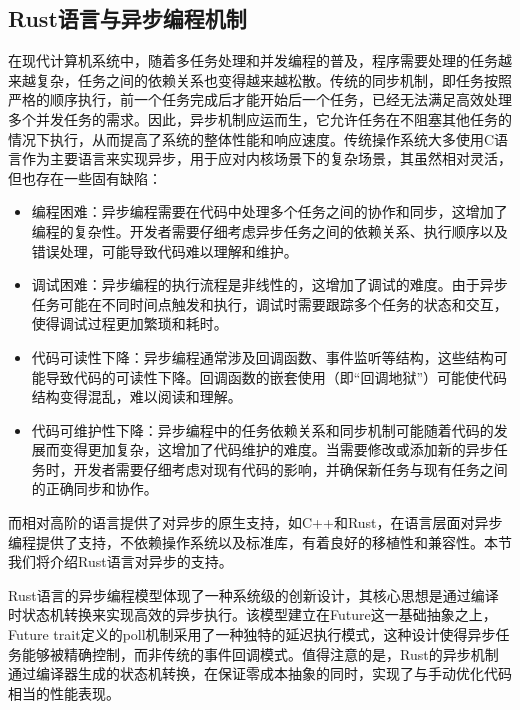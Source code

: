\subsection{Rust语言与异步编程机制}
在现代计算机系统中，随着多任务处理和并发编程的普及\cite{rights2005software}，程序需要处理的任务越来越复杂，任务之间的依赖关系也变得越来越松散。传统的同步机制，即任务按照严格的顺序执行，前一个任务完成后才能开始后一个任务，已经无法满足高效处理多个并发任务的需求\cite{adya2002cooperative}。因此，异步机制应运而生\cite{deligiannis2015asynchronous}，它允许任务在不阻塞其他任务的情况下执行，从而提高了系统的整体性能和响应速度。传统操作系统大多使用C语言作为主要语言来实现异步\cite{bovet2005understanding}，用于应对内核场景下的复杂场景，其虽然相对灵活，但也存在一些固有缺陷：
\begin{itemize}
    \item 编程困难：异步编程需要在代码中处理多个任务之间的协作和同步，这增加了编程的复杂性。开发者需要仔细考虑异步任务之间的依赖关系、执行顺序以及错误处理，可能导致代码难以理解和维护。
    \item 调试困难：异步编程的执行流程是非线性的，这增加了调试的难度。由于异步任务可能在不同时间点触发和执行，调试时需要跟踪多个任务的状态和交互，使得调试过程更加繁琐和耗时。
    \item 代码可读性下降：异步编程通常涉及回调函数、事件监听等结构，这些结构可能导致代码的可读性下降。回调函数的嵌套使用（即“回调地狱”）可能使代码结构变得混乱，难以阅读和理解。
    \item 代码可维护性下降：异步编程中的任务依赖关系和同步机制可能随着代码的发展而变得更加复杂，这增加了代码维护的难度。当需要修改或添加新的异步任务时，开发者需要仔细考虑对现有代码的影响，并确保新任务与现有任务之间的正确同步和协作。
  \end{itemize}

而相对高阶的语言提供了对异步的原生支持，如C++\cite{belson2020c}和Rust\cite{kroning2023concurrency}，在语言层面对异步编程提供了支持，不依赖操作系统以及标准库，有着良好的移植性和兼容性。本节我们将介绍Rust语言对异步的支持\cite{matsakis2018async}。

Rust语言的异步编程模型体现了一种系统级的创新设计，其核心思想是通过编译时状态机转换来实现高效的异步执行\cite{samson2024asynchronous}。该模型建立在Future这一基础抽象之上，Future trait定义的poll机制采用了一种独特的延迟执行模式，这种设计使得异步任务能够被精确控制，而非传统的事件回调模式\cite{edwards2009coherent}。值得注意的是，Rust的异步机制通过编译器生成的状态机转换，在保证零成本抽象的同时\cite{tjader2021rtic}，实现了与手动优化代码相当的性能表现。

